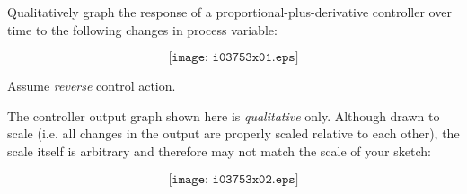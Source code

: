 

Qualitatively graph the response of a proportional-plus-derivative controller over time to the following changes in process variable:

$$\texttt{[image: i03753x01.eps]}$$

Assume {\it reverse} control action.
 






The controller output graph shown here is {\it qualitative} only.  Although drawn to scale (i.e. all changes in the output are properly scaled relative to each other), the scale itself is arbitrary and therefore may not match the scale of your sketch:

$$\texttt{[image: i03753x02.eps]}$$











